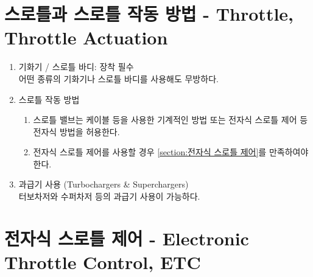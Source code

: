 \documentclass[final,a4paper,10pt]{report}
\begin{document}
\section{스로틀과 스로틀 작동 방법 - Throttle, Throttle Actuation}\label{rule:formula-technical.throttle-actuation} \label{section:스로틀 작동}
\begin{enumerate}
  \item\label{rule:formula-technical.throttle-actuation.carburetor-throttle-body} 기화기 / 스로틀 바디: 장착 필수\\
    어떤 종류의 기화기나 스로틀 바디를 사용해도 무방하다.

  \item\label{rule:formula-technical.throttle-actuation.control-method} 스로틀 작동 방법
    \begin{enumerate}
      \item\label{rule:formula-technical.throttle-actuation.control-method.mechanical-or-electronic} 스로틀 밸브는 케이블 등을 사용한 기계적인 방법 또는 전자식 스로틀 제어 등 전자식 방법을 허용한다.
      \item\label{rule:formula-technical.throttle-actuation.control-method.electronic-method-compliance} 전자식 스로틀 제어를 사용할 경우 \ref{section:전자식 스로틀 제어}를 만족하여야 한다.
    \end{enumerate}

  \item\label{rule:formula-technical.throttle-actuation.turbochargers-and-superchargers} 과급기 사용 (Turbochargers \& Superchargers)\\
    터보차저와 수퍼차저 등의 과급기 사용이 가능하다.
\end{enumerate}

\section{전자식 스로틀 제어 - Electronic Throttle Control, ETC}\label{rule:formula-technical.electronic-throttle-control} \label{section:전자식 스로틀 제어}
\end{document}
